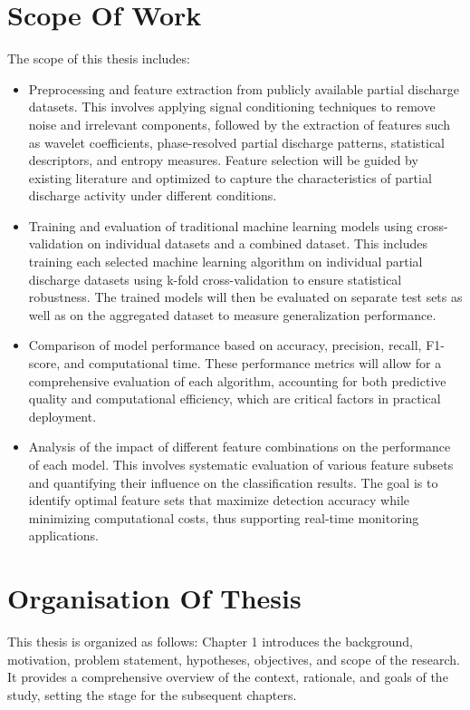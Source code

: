\section{Scope Of Work}

The scope of this thesis includes:
\begin{itemize}
    \item Preprocessing and feature extraction from publicly available partial discharge datasets. This involves applying signal conditioning techniques to remove noise and irrelevant components, followed by the extraction of features such as wavelet coefficients, phase-resolved partial discharge patterns, statistical descriptors, and entropy measures. Feature selection will be guided by existing literature and optimized to capture the characteristics of partial discharge activity under different conditions.
    \item Training and evaluation of traditional machine learning models using cross-validation on individual datasets and a combined dataset. This includes training each selected machine learning algorithm on individual partial discharge datasets using k-fold cross-validation to ensure statistical robustness. The trained models will then be evaluated on separate test sets as well as on the aggregated dataset to measure generalization performance.
    \item Comparison of model performance based on accuracy, precision, recall, F1-score, and computational time. These performance metrics will allow for a comprehensive evaluation of each algorithm, accounting for both predictive quality and computational efficiency, which are critical factors in practical deployment.
    \item Analysis of the impact of different feature combinations on the performance of each model. This involves systematic evaluation of various feature subsets and quantifying their influence on the classification results. The goal is to identify optimal feature sets that maximize detection accuracy while minimizing computational costs, thus supporting real-time monitoring applications.
\end{itemize}

\section{Organisation Of Thesis}

This thesis is organized as follows: Chapter 1 introduces the background, motivation, problem statement, hypotheses, objectives, and scope of the research. It provides a comprehensive overview of the context, rationale, and goals of the study, setting the stage for the subsequent chapters.

